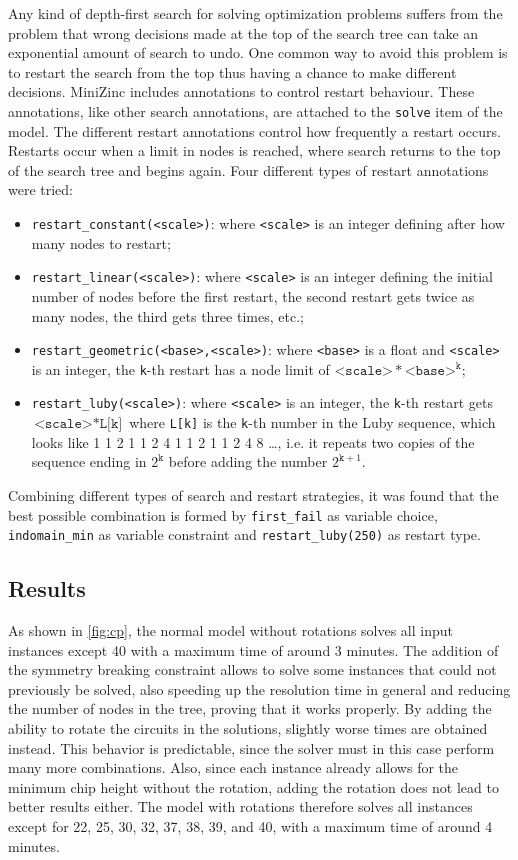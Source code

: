 \documentclass[a4paper, 12pt]{article}
\begin{document}
Any kind of depth-first search for solving optimization problems suffers from the problem that wrong decisions made at the top of the search tree can take an exponential amount of search to undo. One common way to avoid this problem is to restart the search from the top thus having a chance to make different decisions. MiniZinc includes annotations to control restart behaviour. These annotations, like other search annotations, are attached to the \verb|solve| item of the model. The different restart annotations control how frequently a restart occurs. Restarts occur when a limit in nodes is reached, where search returns to the top of the search tree and begins again. Four different types of restart annotations were tried:
\begin{itemize}
    \item \verb|restart_constant(<scale>)|: where \verb|<scale>| is an integer defining after how many nodes to restart;
    \item \verb|restart_linear(<scale>)|: where \verb|<scale>| is an integer defining the initial number of nodes before the first restart, the second restart gets twice as many nodes, the third gets three times, etc.;
    \item \verb|restart_geometric(<base>,<scale>)|: where \verb|<base>| is a float and \verb|<scale>| is an integer, the \verb|k|-th restart has a node limit of $\texttt{<scale>} * \texttt{<base>}^\texttt{k}$;
    \item \verb|restart_luby(<scale>)|: where \verb|<scale>| is an integer, the \verb|k|-th restart gets $\texttt{<scale>} * \texttt{L[k]}$ where \verb|L[k]| is the \verb|k|-th number in the Luby sequence, which looks like 1 1 2 1 1 2 4 1 1 2 1 1 2 4 8 …, i.e. it repeats two copies of the sequence ending in $2^\texttt{k}$ before adding the number $2^{\texttt{k}+1}$.
\end{itemize}

Combining different types of search and restart strategies, it was found that the best possible combination is formed by \verb|first_fail| as variable choice, \verb|indomain_min| as variable constraint and \verb|restart_luby(250)| as restart type.


\subsection{Results}

As shown in \cref{fig:cp}, the normal model without rotations solves all input instances except 40 with a maximum time of around 3 minutes. The addition of the symmetry breaking constraint allows to solve some instances that could not previously be solved, also speeding up the resolution time in general and reducing the number of nodes in the tree, proving that it works properly. By adding the ability to rotate the circuits in the solutions, slightly worse times are obtained instead. This behavior is predictable, since the solver must in this case perform many more combinations. Also, since each instance already allows for the minimum chip height without the rotation, adding the rotation does not lead to better results either. The model with rotations therefore solves all instances except for 22, 25, 30, 32, 37, 38, 39, and 40, with a maximum time of around 4 minutes.
\end{document}
